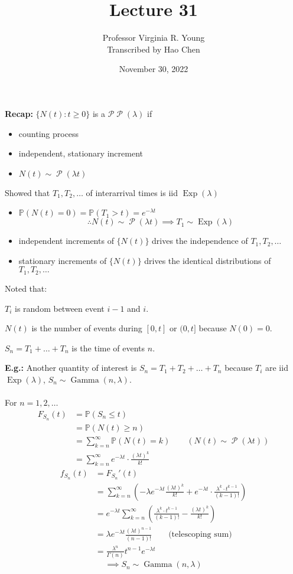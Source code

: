 \documentclass[a4paper]{article}
\title{Lecture 31}
\author{Professor Virginia R. Young\\ \small{Transcribed by Hao Chen}}
\date{November 30, 2022}
\newcommand{\n}{\hfill\break}
\newcommand{\recap}[1]{\par\noindent\settowidth{\hangindent}{\textbf{Recap: }}\textbf{Recap: }#1\n}
\newcommand{\eg}[1]{\par\noindent\settowidth{\hangindent}{\textbf{E.g.: }}\textbf{E.g.: }#1\n}
\newcommand{\Prob}{\mathbb{P}}
\renewcommand{\P}{\Prob}
\DeclareMathOperator{\Poiss}{\mathcal{P}}
\DeclareMathOperator{\Gam}{\text{Gamma}}
\DeclareMathOperator{\Exp}{\text{Exp}}
\begin{document}
\maketitle

\recap{
$\{N(t): t\geq 0\}$ is a $\mathcal{P}\Poiss(\lambda)$ if
\begin{itemize}
    \item counting process
    \item independent, stationary increment
    \item $N(t)\sim\Poiss(\lambda t)$
\end{itemize}
Showed that $T_1, T_2, \dots$ of interarrival times is iid $\Exp(\lambda)$
\begin{itemize}
    \item $\P(N(t)=0)=\P(T_1>t)=e^{-\lambda t}$
    \[\therefore N(t)\sim\Poiss(\lambda t)\implies T_1\sim\Exp(\lambda)\]
    \item independent increments of $\{N(t)\}$ drives the independence of $T_1, T_2, \dots$
    \item stationary increments of $\{N(t)\}$ drives the identical distributions of $T_1, T_2, \dots$
\end{itemize}
Noted that:
\begin{description}
    \item $T_i$ is random between event $i-1$ and $i$.
    \item $N(t)$ is the number of events during $[0,t]$ or $(0,t]$ because $N(0)=0$.
    \item $S_n=T_1+\dots+T_n$ is the time of events $n$.
\end{description}
}

\eg{
Another quantity of interest is  $S_n=T_1+T_2+\dots+T_n$ because $T_i$ are iid $\Exp(\lambda)$, $S_n\sim\Gam(n,\lambda)$.
\\\\
For $n=1,2,\dots$
\begin{align*}
    F_{S_n}(t)&=\P(S_n\leq t) \\
    &=\P(N(t)\geq n) \\
    &=\sum^\infty_{k=n}\P(N(t)=k) \qquad(N(t)\sim\Poiss(\lambda t)) \\
    &=\sum^\infty_{k=n}e^{-\lambda t}\cdot\frac{(\lambda t)^k}{k!}
\end{align*}
\begin{align*}
    f_{S_n}(t)&=F_{S_n}'(t) \\
    &=\sum^\infty_{k=n}\left(-\lambda e^{-\lambda t}\frac{(\lambda t)^k}{k!}+e^{-\lambda t}\cdot\frac{\lambda^k\cdot t^{k-1}}{(k-1)!}\right) \\
    &=e^{-\lambda t}\sum^\infty_{k=n}\left(\frac{\lambda^k\cdot t^{k-1}}{(k-1)!}-\frac{(\lambda t)^k}{k!}\right) \\
    &=\lambda e^{-\lambda t}\frac{(\lambda t)^{n-1}}{(n-1)!} \qquad\text{(telescoping sum)} \\
    &=\frac{\lambda^n}{\Gamma(n)}t^{n-1}e^{-\lambda t}
\end{align*}
\[\implies S_n\sim\Gam(n, \lambda)\]
}
\end{document}

